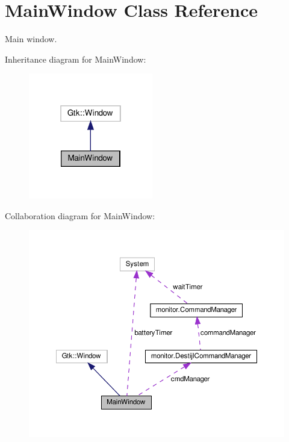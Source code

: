 \section{Main\+Window Class Reference}
\label{class_main_window}


Main window.  




Inheritance diagram for Main\+Window\+:\nopagebreak
\begin{figure}[H]
\begin{center}
\leavevmode
\includegraphics[width=154pt]{class_main_window__inherit__graph}
\end{center}
\end{figure}


Collaboration diagram for Main\+Window\+:
\nopagebreak
\begin{figure}[H]
\begin{center}
\leavevmode
\includegraphics[width=350pt]{class_main_window__coll__graph}
\end{center}
\end{figure}
